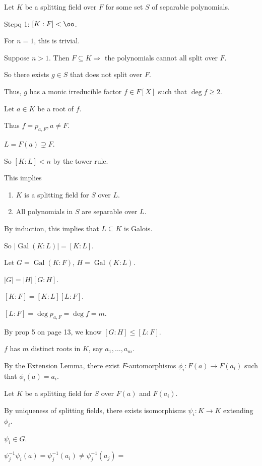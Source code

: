 \documentclass[x11names,reqno,14pt]{extarticle}
\DeclareMathOperator{\Gal}{Gal}
\begin{document}
Let $K$ be a splitting field over $F$ for some set $S$ of separable polynomials. 

Stepq 1: $[K:F]<\oo$. 

For $n = 1$, this is trivial. 

Suppose $n > 1$. Then $F \subseteq K \Rightarrow$ the polynomials cannot all split over $F$. 

So there exists $g \in S$ that does not split over $F$. 

Thus, $g$ has a monic irreducible factor $f \in F[X]$ such that $\deg f \geq 2$. 

Let $a \in K$ be a root of $f$. 

Thus $f = p_{a, F}, a \neq F$. 

$L = F(a) \supsetneq F$. 

So $[K:L]<n$ by the tower rule. 

This implies

\begin{enumerate}

\item $K$ is a splitting field for $S$ over $L$. 

\item All polynomials in $S$ are separable over $L$.

\end{enumerate}

By induction, this implies that $L \subseteq K$ is Galois. 

So $|\Gal(K:L)| = [K:L]$.

Let $G = \Gal(K:F)$, $H = \Gal(K:L)$. 

$|G| = |H|[G:H]$. 

$[K:F] = [K:L][L:F]$. 

$[L:F] = \deg p_{a, F} = \deg f = m$. 

By prop 5 on page 13, we know $[G:H] \leq [L:F]$. 

$f$ has $m$ distinct roots in $K$, say $a_1, \dots, a_m$. 

By the Extension Lemma, there exist $F$-automorphisms $\phi_i:F(a)\to F(a_i)$ such that $\phi_i(a) = a_i$. 

Let $K$ be a splitting field for $S$ over $F(a)$ and $F(a_i)$. 

By uniqueness of splitting fields, there exists isomorphisms $\psi_i:K\to K$ extending $\phi_i$. 

$\psi_i \in G$. 

$\psi_j^{-1}\psi_i(a) = \psi_j^{-1}(a_i) \neq \psi_j^{-1}(a_j) = $
\end{document}
